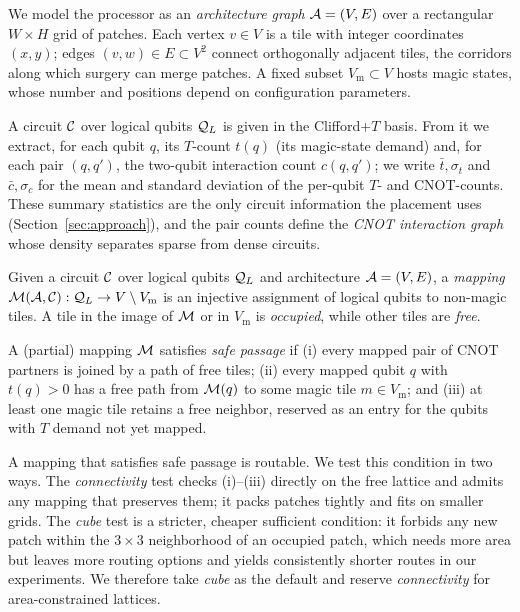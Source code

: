 We model the processor as an \emph{architecture graph} $\mathcal{A}=(V,E)$ over a
rectangular $W\times H$ grid of patches. Each vertex $v\in V$ is a tile with
integer coordinates $(x,y)$; edges $(v,w)\in E \subset V^2$ connect orthogonally adjacent tiles, the
corridors along which surgery can merge patches. A fixed subset
$V_{\mathrm m}\subset V$ hosts magic states, whose number and positions depend on
configuration parameters.

A circuit $\mathcal{C}$ over logical qubits $\mathcal{Q}_L$ is given in the Clifford$+T$ basis. From
it we extract, for each qubit $q$, its $T$-count $t(q)$ (its magic-state demand)
and, for each pair $(q,q')$, the two-qubit interaction count $c(q,q')$; we write
$\bar t,\sigma_t$ and $\bar c,\sigma_c$ for the mean and standard deviation of the
per-qubit $T$- and CNOT-counts. These summary statistics are the only circuit
information the placement uses  (Section~\ref{sec:approach}), and the pair counts
define the \emph{CNOT interaction graph} whose density separates sparse from dense circuits.

\begin{definition}
\label{def:mapping}
    Given a circuit $\mathcal{C}$ over logical qubits $\mathcal{Q}_L$ and architecture $\mathcal{A}=(V,E)$, a \emph{mapping}
    $\mathcal{M}(\mathcal{A},\mathcal{C}) : \mathcal{Q}_L \to V\setminus V_{\mathrm m}$ is an injective assignment of
    logical qubits to non-magic tiles. A tile in the image of $\mathcal{M}$ or in $V_{\mathrm m}$ 
    is \emph{occupied}, while other tiles are \emph{free}.
\end{definition}

\begin{definition}
\label{def:safepassage}
    A (partial) mapping $\mathcal{M}$ satisfies \emph{safe passage} if
    (i) every mapped pair of CNOT partners is joined by a path of free tiles;
    (ii) every mapped qubit $q$ with $t(q)>0$ has a free path from $\mathcal{M}(q)$ to some
    magic tile $m\in V_{\mathrm m}$; and
    (iii) at least one magic tile retains a free neighbor, reserved as an entry
    for the qubits with $T$ demand not yet mapped.
\end{definition}

A mapping that satisfies safe passage is routable. We test this condition in two ways. 
The \emph{connectivity} test checks
(i)--(iii) directly on the free lattice and admits any mapping that preserves
them; it packs patches tightly and fits on smaller grids. The \emph{cube} test is
a stricter, cheaper sufficient condition: it forbids any new patch within the
$3\times3$ neighborhood of an occupied patch, which needs more area but leaves
more routing options and yields consistently shorter routes in our experiments. We
therefore take \emph{cube} as the default and reserve \emph{connectivity} for
area-constrained lattices.

